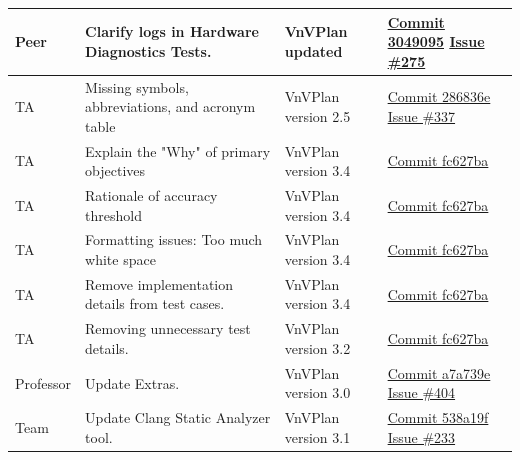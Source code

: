 \documentclass{article}
\begin{document}
\begin{longtable}{|p{2cm}|p{4.5cm}|p{3.5cm}|p{3cm}|}
    Peer &
    Clarify logs in Hardware Diagnostics Tests. &
    VnVPlan updated & 
    \href{https://github.com/Team6-SixSense/audio360/commit/3049095}{Commit
        3049095}
    \newline
    \href{https://github.com/Team6-SixSense/audio360/issues/275}{Issue \#275} \\
    \hline

    TA &
    Missing symbols, abbreviations, and acronym table &
    VnVPlan version 2.5 & 
    \href{https://github.com/Team6-SixSense/audio360/commit/286836e}{Commit
        286836e} 
    \newline
    \href{https://github.com/Team6-SixSense/audio360/issues/337}{Issue \#337} \\
    \hline

    TA &
    Explain the "Why" of primary objectives &
    VnVPlan version 3.4 & 
    \href{https://github.com/Team6-SixSense/audio360/commit/fc627ba}{Commit
        fc627ba} \\
    \hline

    TA &
    Rationale of accuracy threshold &
    VnVPlan version 3.4 & 
    \href{https://github.com/Team6-SixSense/audio360/commit/fc627ba}{Commit
        fc627ba} \\
    \hline

    TA &
    Formatting issues: Too much white space &
    VnVPlan version 3.4 & 
    \href{https://github.com/Team6-SixSense/audio360/commit/fc627ba}{Commit
        fc627ba} \\
    \hline

    TA &
    Remove implementation details from test cases. &
    VnVPlan version 3.4 & 
    \href{https://github.com/Team6-SixSense/audio360/commit/fc627ba}{Commit
        fc627ba} \\
    \hline

    TA &
    Removing unnecessary test details. &
    VnVPlan version 3.2 & 
    \href{https://github.com/Team6-SixSense/audio360/commit/fc627ba}{Commit
        fc627ba} \\
    \hline

    Professor &
    Update Extras. &
    VnVPlan version 3.0 & 
    \href{https://github.com/Team6-SixSense/audio360/commit/a7a739e}{Commit
        a7a739e}
    \newline
    \href{https://github.com/Team6-SixSense/audio360/issues/404}{Issue \#404} \\
    \hline

    Team &
    Update Clang Static Analyzer tool. &
    VnVPlan version 3.1 & 
    \href{https://github.com/Team6-SixSense/audio360/commit/538a19f}{Commit
        538a19f}
    \newline
    \href{https://github.com/Team6-SixSense/audio360/issues/233}{Issue \#233} \\
    \hline


\end{longtable}
\end{document}
